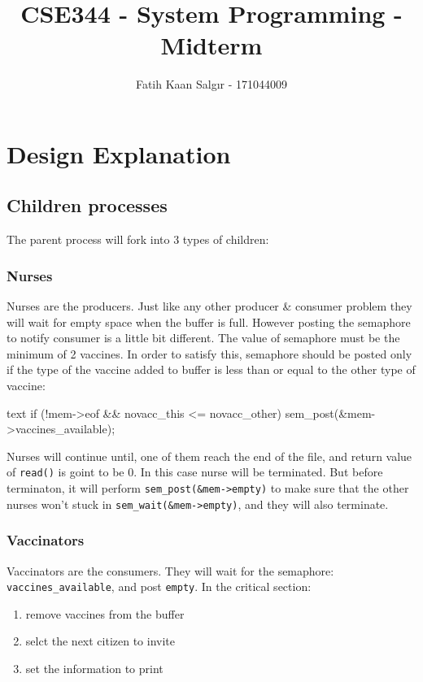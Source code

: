\documentclass[a4paper]{article}
\author{Fatih Kaan Salgır - 171044009}
\date{}
\title{CSE344 - System Programming - Midterm}
\begin{document}
\maketitle

\section{Design Explanation}
\label{sec:org77741c8}

\subsection{Children processes}
\label{sec:org14c3797}
The parent process will fork into 3 types of children:

\subsubsection{Nurses}
\label{sec:orga1d9756}
Nurses are the producers. Just like any other producer \& consumer problem they will wait for empty space when the buffer is full. However posting the semaphore to notify consumer is a little bit different. The value of semaphore must be the minimum of 2 vaccines. In order to satisfy this, semaphore should be posted only if the type of the vaccine added to buffer is less than or equal to the other type of vaccine:

\begin{ccode}[fontsize=\small,frame=single,framesep=3mm]{text}
if (!mem->eof && novacc_this <= novacc_other)
  sem_post(&mem->vaccines_available);
\end{ccode}

Nurses will continue until, one of them reach the end of the file, and return value of \texttt{read()} is goint to be 0. In this case nurse will be terminated. But before terminaton, it will perform \texttt{sem\_post(\&mem->empty)} to make sure that the other nurses won't stuck in \texttt{sem\_wait(\&mem->empty)}, and they will also terminate.

\subsubsection{Vaccinators}
\label{sec:org782ef75}
Vaccinators are the consumers. They will wait for the semaphore: \texttt{vaccines\_available}, and post \texttt{empty}. In the critical section:
\begin{enumerate}
\item remove vaccines from the buffer
\item selct the next citizen to invite
\item set the information to print
\end{enumerate}
\end{document}
